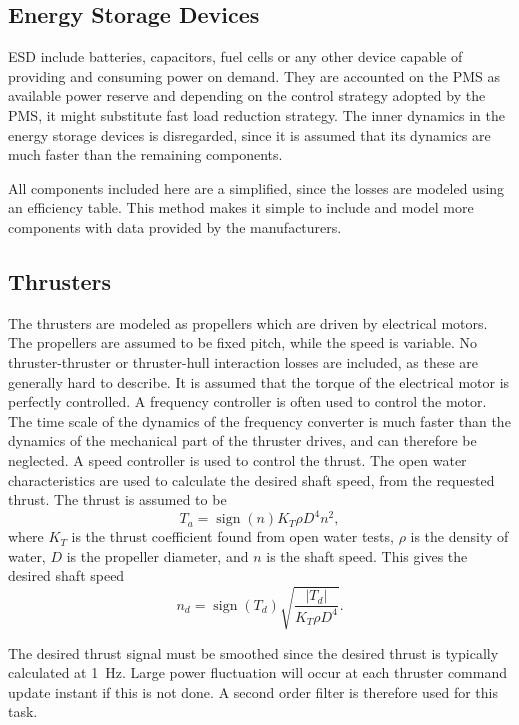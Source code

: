 \documentclass[journal]{IEEEtran}
\begin{document}
\subsection{Energy Storage Devices}
ESD include batteries, capacitors, fuel cells or any other device capable of providing and consuming power on demand. They are accounted on the PMS as available power reserve and depending on the control strategy adopted by the PMS, it might substitute fast load reduction strategy. The inner dynamics in the energy storage devices is disregarded, since it is assumed that its dynamics are much faster than the remaining components.

All components included here are a simplified, since the losses are modeled using an efficiency table. This method makes it simple to include and model more components with data provided by the manufacturers.


\subsection{Thrusters}
The thrusters are modeled as propellers which are driven by electrical motors.
The propellers are assumed to be fixed pitch, while the speed is variable.
No thruster-thruster or thruster-hull interaction losses are included, as these are generally hard to describe.
It is assumed that the torque of the electrical motor is perfectly controlled.
A frequency controller is often used to control the motor.
The time scale of the dynamics of the frequency converter is much faster than the dynamics of the mechanical part of the thruster drives, and can therefore be neglected.
A speed controller is used to control the thrust. 
The open water characteristics are used to calculate the desired shaft speed, from the requested thrust.
The thrust is assumed to be~\cite{Sorensen2013}
\begin{equation}
T_a = \operatorname{sign}(n)K_T \rho D^4 n^2,
\end{equation}
where $K_T$ is the thrust coefficient found from open water tests, $\rho$ is the density of water, $D$ is the propeller diameter, and $n$ is the shaft speed.
This gives the desired shaft speed
\begin{equation}
n_d = \operatorname{sign}(T_d) \sqrt{\frac{|T_d|}{K_T \rho D^4}}.
\end{equation}

The desired thrust signal must be smoothed since the desired thrust is typically calculated at 1~Hz.
Large power fluctuation will occur at each thruster command update instant if this is not done.
A second order filter is therefore used for this task.
\end{document}
